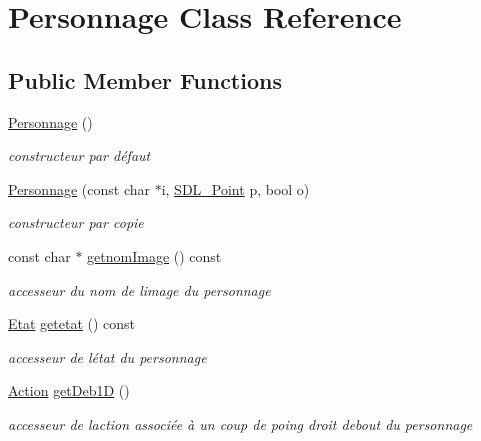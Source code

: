 \hypertarget{class_personnage}{}\section{Personnage Class Reference}
\label{class_personnage}
\subsection*{Public Member Functions}
\begin{DoxyCompactItemize}
\item 
\mbox{\label{class_personnage_abec36eb0310adc71f3375297fc590c65}} 
\hyperlink{class_personnage_abec36eb0310adc71f3375297fc590c65}{Personnage} ()
\begin{DoxyCompactList}\small\item\em constructeur par défaut \end{DoxyCompactList}\item 
\hyperlink{class_personnage_a010d2aba07a45df0374e0c7df2bcb659}{Personnage} (const char $\ast$i, \hyperlink{struct_s_d_l___point}{S\+D\+L\+\_\+\+Point} p, bool o)
\begin{DoxyCompactList}\small\item\em constructeur par copie \end{DoxyCompactList}\item 
const char $\ast$ \hyperlink{class_personnage_ae2ddf2bf9d9077de27066d559178617b}{getnom\+Image} () const
\begin{DoxyCompactList}\small\item\em accesseur du nom de l\textquotesingle{}image du personnage \end{DoxyCompactList}\item 
\hyperlink{class_etat}{Etat} \hyperlink{class_personnage_a91cd89d2c8b00aacae61437e8685ce67}{getetat} () const
\begin{DoxyCompactList}\small\item\em accesseur de l\textquotesingle{}état du personnage \end{DoxyCompactList}\item 
\hyperlink{class_action}{Action} \hyperlink{class_personnage_a08db6e6280d578c9a6fa7420a4a7dcc3}{get\+Deb1D} ()
\begin{DoxyCompactList}\small\item\em accesseur de l\textquotesingle{}action associée à un coup de poing droit debout du personnage \end{DoxyCompactList}\item 

\end{DoxyCompactItemize}
